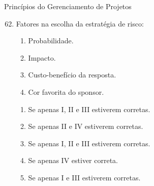 \documentclass{beamer}
\begin{document}
\begin{frame}{Princípios do Gerenciamento de Projetos}
	\begin{enumerate}
		\setcounter{enumi}{61}
		\justifying
		\item Fatores na escolha da estratégia de risco:
		\begin{enumerate}[I]
			\item Probabilidade.
			\item Impacto.
			\item Custo-benefício da resposta.
			\item Cor favorita do sponsor.
		\end{enumerate}
		\begin{enumerate}[a]
			\item Se apenas I, II e III estiverem corretas.
			\item Se apenas II e IV estiverem corretas.
			\item \alert<2>{Se apenas I, II e III estiverem corretas.}
			\item Se apenas IV estiver correta.
			\item Se apenas I e III estiverem corretas.
		\end{enumerate}
	\end{enumerate}
\end{frame}
\end{document}
